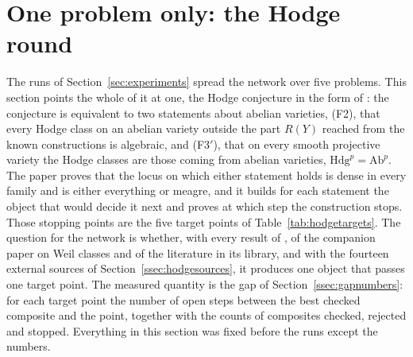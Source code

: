 \section{One problem only: the Hodge round}\label{sec:hodgeround}

The runs of Section~\ref{sec:experiments} spread the network over five problems. This section points the whole of it at one, the Hodge conjecture in the form of \cite{BB26c}: the conjecture is equivalent to two statements about abelian varieties, (F2), that every Hodge class on an abelian variety outside the part $R(Y)$ reached from the known constructions is algebraic, and (F3$'$), that on every smooth projective variety the Hodge classes are those coming from abelian varieties, $\mathrm{Hdg}^{p}=\mathrm{Ab}^{p}$. The paper proves that the locus on which either statement holds is dense in every family and is either everything or meagre, and it builds for each statement the object that would decide it next and proves at which step the construction stops. Those stopping points are the five target points of Table~\ref{tab:hodgetargets}. The question for the network is whether, with every result of \cite{BB26c}, of the companion paper on Weil classes \cite{BMB26b} and of the literature in its library, and with the fourteen external sources of Section~\ref{ssec:hodgesources}, it produces one object that passes one target point. The measured quantity is the gap of Section~\ref{ssec:gapnumbers}: for each target point the number of open steps between the best checked composite and the point, together with the counts of composites checked, rejected and stopped. Everything in this section was fixed before the runs except the numbers.

